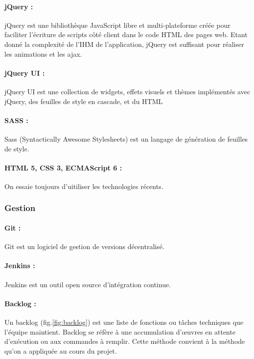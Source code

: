 \paragraph{jQuery :}
jQuery est une bibliothèque JavaScript libre et multi-plateforme créée pour faciliter l'écriture de scripts côté client dans le code HTML des pages web.
Etant donné la complexité de l'IHM de l'application, jQuery est suffisant pour réaliser les animations et les ajax.

\paragraph{jQuery UI :}
jQuery UI est une collection de widgets, effets visuels et thèmes implémentés avec jQuery, des feuilles de style en cascade, et du HTML

\paragraph{SASS :}
Sass (Syntactically Awesome Stylesheets) est un langage de génération de feuilles de style.

\paragraph{HTML 5, CSS 3, ECMAScript 6 :}
On essaie toujours d'uitiliser les technologies récents.

\subsubsection*{Gestion}

\paragraph{Git :}
Git est un logiciel de gestion de versions décentralisé.

\paragraph{Jenkins :}
Jenkins est un outil open source d'intégration continue.

\paragraph{Backlog :}
Un backlog (fig.\ref{fig:backlog}) est une liste de fonctions ou tâches techniques que l'équipe maintient.
Backlog se réfère à une accumulation d'œuvres en attente d'exécution ou aux commandes à remplir.
Cette méthode convient à la méthode qu'on a appliquée au cours du projet.

